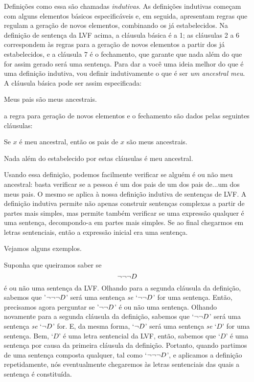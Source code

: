 Definições como essa são chamadas \emph{indutivas}.
As definições indutivas começam com alguns elementos básicos especificáveis e, em seguida, apresentam regras que regulam a geração de novos elementos, combinando os já estabelecidos.
Na definição de sentença da LVF acima, a cláusula básica é a 1; as cláusulas 2 a 6 correspondem às regras para a geração de novos elementos a partir dos já estabelecidos, e a cláusula 7 é o fechamento, que garante que nada além do que for assim gerado será uma sentença.
Para dar a você uma ideia melhor do que é uma definição indutiva, vou definir indutivamente o que é ser \emph{um ancestral meu}.
A cláusula básica pode ser assim especificada:
	\begin{ebullet}
		\item Meus pais são meus ancestrais.
	\end{ebullet}
a regra para geração de novos elementos e o fechamento são dados pelas seguintes cláusulas:
	\begin{ebullet}
		\item Se $x$ é meu ancestral, então os pais de $x$ são meus ancestrais.
		\item Nada além do estabelecido por estas cláusulas é meu ancestral.
	\end{ebullet}
Usando essa definição, podemos facilmente verificar se alguém é ou não meu ancestral:
basta verificar se a pessoa é um dos pais de um dos pais de...um dos meus pais.
O mesmo se aplica à nossa definição indutiva de sentenças de LVF.
A definição indutiva permite não apenas construir sentenças complexas a partir de partes mais simples, mas permite também verificar se uma expressão qualquer é uma sentença, decompondo-a em partes mais simples. Se ao final chegarmos em letras sentenciais, então a expressão inicial era uma sentença.

Vejamos alguns exemplos.

Suponha que queiramos saber se
$$\neg\neg\neg D$$
é ou não uma sentença da LVF.
Olhando para a segunda cláusula da definição, sabemos que '$\neg\neg\neg D$' será uma sentença \emph{se} `$\neg\neg D$' for uma sentença.
Então, precisamos agora perguntar se '$\neg\neg D$' é ou não uma sentença.
Olhando novamente para a segunda cláusula da definição, sabemos que `$\neg\neg D$' será uma sentença \emph{se} `$\neg D$' for.
E, da mesma forma, `$\neg D$' será uma sentença \emph{se} `$D$' for uma sentença.
Bem, `$D$' é uma letra sentencial da LVF, então, sabemos que `$D$' é uma sentença por causa da primeira cláusula da definição.
Portanto, quando partimos de uma sentença composta qualquer, tal como `$\neg\neg\neg D$', e aplicamos a definição repetidamente, nós eventualmente chegaremos às letras sentenciais das quais a sentença é constituída.

